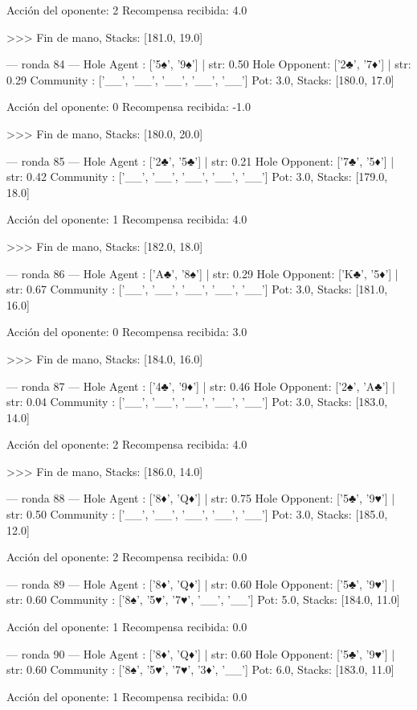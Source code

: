 Acción del oponente: 2
Recompensa recibida: 4.0

>>> Fin de mano, Stacks: [181.0, 19.0]


--- ronda 84 ---
Hole Agent : ['5♠', '9♠'] | str: 0.50
Hole Opponent: ['2♣', '7♦'] | str: 0.29
Community  : ['__', '__', '__', '__', '__']
Pot: 3.0, Stacks: [180.0, 17.0]

Acción del oponente: 0
Recompensa recibida: -1.0

>>> Fin de mano, Stacks: [180.0, 20.0]


--- ronda 85 ---
Hole Agent : ['2♣', '5♣'] | str: 0.21
Hole Opponent: ['7♣', '5♦'] | str: 0.42
Community  : ['__', '__', '__', '__', '__']
Pot: 3.0, Stacks: [179.0, 18.0]

Acción del oponente: 1
Recompensa recibida: 4.0

>>> Fin de mano, Stacks: [182.0, 18.0]


--- ronda 86 ---
Hole Agent : ['A♣', '8♠'] | str: 0.29
Hole Opponent: ['K♣', '5♦'] | str: 0.67
Community  : ['__', '__', '__', '__', '__']
Pot: 3.0, Stacks: [181.0, 16.0]

Acción del oponente: 0
Recompensa recibida: 3.0

>>> Fin de mano, Stacks: [184.0, 16.0]


--- ronda 87 ---
Hole Agent : ['4♣', '9♦'] | str: 0.46
Hole Opponent: ['2♠', 'A♣'] | str: 0.04
Community  : ['__', '__', '__', '__', '__']
Pot: 3.0, Stacks: [183.0, 14.0]

Acción del oponente: 2
Recompensa recibida: 4.0

>>> Fin de mano, Stacks: [186.0, 14.0]


--- ronda 88 ---
Hole Agent : ['8♦', 'Q♦'] | str: 0.75
Hole Opponent: ['5♣', '9♥'] | str: 0.50
Community  : ['__', '__', '__', '__', '__']
Pot: 3.0, Stacks: [185.0, 12.0]

Acción del oponente: 2
Recompensa recibida: 0.0

--- ronda 89 ---
Hole Agent : ['8♦', 'Q♦'] | str: 0.60
Hole Opponent: ['5♣', '9♥'] | str: 0.60
Community  : ['8♠', '5♥', '7♥', '__', '__']
Pot: 5.0, Stacks: [184.0, 11.0]

Acción del oponente: 1
Recompensa recibida: 0.0

--- ronda 90 ---
Hole Agent : ['8♦', 'Q♦'] | str: 0.60
Hole Opponent: ['5♣', '9♥'] | str: 0.60
Community  : ['8♠', '5♥', '7♥', '3♦', '__']
Pot: 6.0, Stacks: [183.0, 11.0]

Acción del oponente: 1
Recompensa recibida: 0.0

